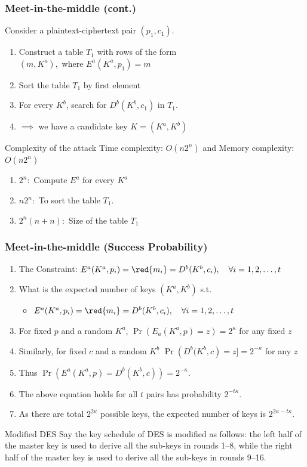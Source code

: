 \documentclass{cubeamer}
\begin{document}
\begin{frame}
	\frametitle{Meet-in-the-middle (cont.)}
	Consider a plaintext-ciphertext pair $(p_1,c_1)$.
	\begin{enumerate}
		\item Construct a table $T_1$ with rows of the form 
		$(m,K^a), \text{ where } E^a(K^a,p_1) = m$
		\item Sort the table $T_1$ by first element
		\item For every $K^b$, search for $D^b(K^b,c_1)$ in $T_1$.
        \item {} $\implies$ we have a candidate key $K = (K^a,K^b)$
	\end{enumerate}
    \pause
    \begin{block}{Complexity of the attack}
		Time complexity: $O(n2^{n})$ and Memory complexity: $O(n 2^n)$
		\begin{enumerate}
			\item $2^{n}:$ Compute $E^a$ for every $K^a$
			\item $n2^n:$ To sort the table $T_1$.
			\item $2^n(n+n):$ Size of the table $T_1$
		\end{enumerate}
	\end{block}
\end{frame}

\begin{frame}
	\frametitle{Meet-in-the-middle (Success Probability)}
	\begin{enumerate}
        \item The Constraint: \(E^a(K^a, p_i) = \red{m_i} = D^b(K^b, c_i), \quad \forall i=1, 2, \dots, t\)
        \pause
        \item What is the expected number of keys $(K^a,K^b)$ s.t. 
            \begin{itemize}
                \item \(E^a(K^a, p_i) = \red{m_i} = D^b(K^b, c_i), \quad \forall i=1, 2, \dots, t\)
            \end{itemize}
        \pause
		\item For fixed $p$ and a random $K^a$, $\Pr\left(E_a(K^a,p) = z\right) = 2^{\kappa}$ for any fixed $z$
		\item Similarly, for fixed $c$ and a random $K^b$ $\Pr\left(D^b(K^b,c\right) = z] = 2^{-\kappa}$ for any $z$
        \pause
		\item Thus $\Pr\left(E^a(K^a,p) = D^b(K^b,c)\right) = 2^{-\kappa}$.
        \pause
    \item The above equation holds for all $t$ pairs has probability $2^{-t\kappa}$.
		\item As there are total $2^{2\kappa}$ possible keys, the expected number of keys is $2^{2\kappa - t\kappa}$.
	\end{enumerate}
    \pause
    \begin{block}{Modified DES}
		Say the key schedule of DES is modiﬁed as follows: the left half of the
		master key is used to derive all the sub-keys in rounds 1–8, while the
		right half of the master key is used to derive all the sub-keys in rounds
		9–16.
	\end{block}
\end{frame}
\end{document}
